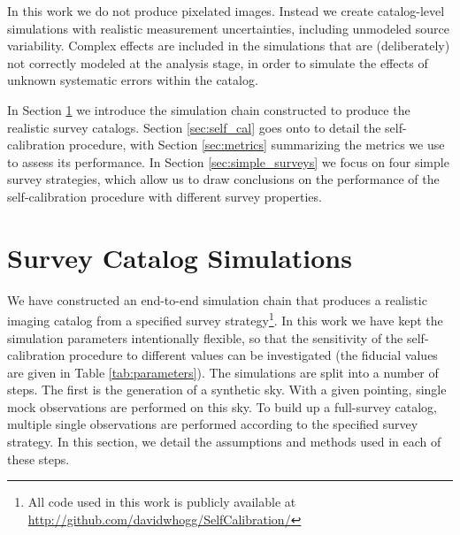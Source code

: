 \documentclass[preprint,pdftex]{aastex}
\begin{document}
In this work we do not produce pixelated images.  Instead we create catalog-level simulations with realistic measurement uncertainties, including unmodeled source variability.  Complex effects are included in the simulations that are (deliberately) not correctly modeled at the analysis stage, in order to simulate the effects of unknown systematic errors within the catalog.

In Section \ref{sec:survey_simulations} we introduce the simulation chain constructed to produce the realistic survey catalogs. Section \ref{sec:self_cal} goes onto to detail the self-calibration procedure, with Section \ref{sec:metrics} summarizing the metrics we use to assess its performance. In Section \ref{sec:simple_surveys} we focus on four simple survey strategies, which allow us to draw conclusions on the performance of the self-calibration procedure with different survey properties. 

\section{Survey Catalog Simulations}
\label{sec:survey_simulations}
We have constructed an end-to-end simulation chain that produces a realistic imaging catalog from a specified survey strategy\footnote{All code used in this work is publicly available at \url{http://github.com/davidwhogg/SelfCalibration/}}. In this work we have kept the simulation parameters intentionally flexible, so that the sensitivity of the self-calibration procedure to different values can be investigated (the fiducial values are given in Table \ref{tab:parameters}). The simulations are split into a number of steps. The first is the generation of a synthetic sky. With a given pointing, single mock observations are performed on this sky. To build up a full-survey catalog, multiple single observations are performed according to the specified survey strategy. In this section, we detail the assumptions and methods used in each of these steps. 
\end{document}
